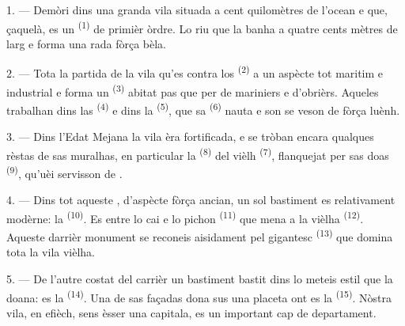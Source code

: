 
\VUsaut{2.0mm}
\VUsaut{3.0mm}
\VUfilet{16mm}
\VUsaut{5.6mm}
\VUsaut{1.4mm}
\VUsaut{2.2mm}

\VUsaut{3.0mm}

1. --- Demòri dins una granda vila situada a cent quilomètres de l'ocean e que,
çaquelà, es un  \textsuperscript{(1)} de primièr òrdre. Lo riu que la
banha a quatre cents mètres de larg e forma una rada fòrça bèla.

2. --- Tota la partida de la vila qu'es contra los 
\textsuperscript{(2)} a un aspècte tot maritim e industrial e forma un
 \textsuperscript{(3)} abitat pas que per de mariniers e
d'obrièrs. Aqueles trabalhan dins las  \textsuperscript{(4)} e
dins la  \textsuperscript{(5)}, que sa 
\textsuperscript{(6)} nauta e son  se veson de fòrça luènh.

3. --- Dins l'Edat Mejana la vila èra fortificada, e se tròban encara qualques
rèstas de sas muralhas, en particular la  \textsuperscript{(8)} del
vièlh  \textsuperscript{(7)}, flanquejat per sas doas
 \textsuperscript{(9)}, qu'uèi servisson de .

4. --- Dins tot aqueste , d'aspècte fòrça ancian, un sol
bastiment es relativament modèrne: la  \textsuperscript{(10)}. Es
entre lo cai e lo pichon  \textsuperscript{(11)} que mena a la
vièlha  \textsuperscript{(12)}. Aqueste darrièr monument se
reconeis aisidament pel gigantesc  \textsuperscript{(13)} que
domina tota la vila vièlha.

5. --- De l'autre costat del carrièr  un bastiment bastit dins lo
meteis estil que la doana: es la  \textsuperscript{(14)}. Una de sas
façadas dona sus una placeta ont es la  \textsuperscript{(15)}.
Nòstra vila, en efièch, sens èsser una capitala, es un important cap de
departament.

